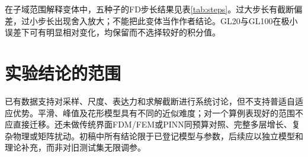 在子域范围解释变体中，五种子的FD步长结果见表\ref{tab:steps}。过大步长有截断偏差，过小步长出现舍入放大；不能把此变体当作作者结论。GL20与GL100在极小误差下可有明显相对变化，均保留而不选择较好的积分值。
\begin{table}[htbp]\centering\caption{FD步长独立诊断，$m=160,N=1000$}\label{tab:steps}\end{table}

\section{实验结论的范围}
已有数据支持对采样、尺度、表达力和求解截断进行系统讨论，但不支持普适自适应优势。平滑、峰值及花形模型具有不同的近似难度；对一个算例表现好的范围不应直接迁移。还未做传统界面FDM/FEM或PINN同预算对照、完整多层增长、复杂物理或矩阵扰动。初稿中所有结论限于已登记模型与参数，后续应以独立模型和理论补充，而非对旧测试集无限调参。

